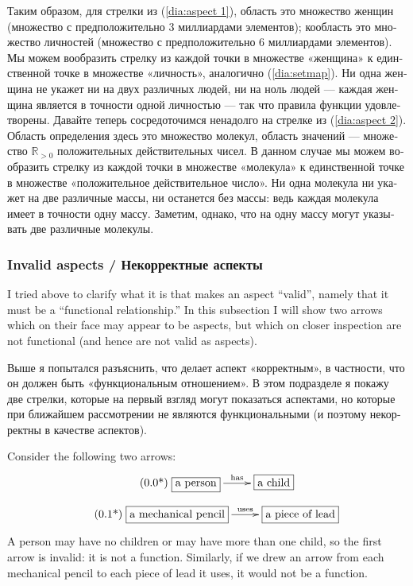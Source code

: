 \documentclass[a4paper]{book}
\def\tn{\textnormal}
\def\RR{{\mathbb R}}
\newcommand{\LA}[2]{\ar[#1]^-{\tn {#2}}}
\theoremstyle{myth}
\begin{document}
\begin{russian}
Таким образом, для стрелки из (\ref{dia:aspect 1}), область это множество женщин (множество с предположительно 3 миллиардами элементов); кообласть это множество личностей (множество с предположительно 6 миллиардами элементов).  Мы можем вообразить стрелку из каждой точки в множестве «женщина» к единственной точке в множестве «личность», аналогично (\ref{dia:setmap}).  Ни одна женщина не укажет ни на двух различных людей, ни на ноль людей — каждая женщина является в точности одной личностью — так что правила функции удовлетворены.  Давайте теперь сосредоточимся ненадолго на стрелке из (\ref{dia:aspect 2}).  Область определения здесь это множество молекул, область значений — множество $\RR_{>0}$ положительных действительных чисел.  В данном случае мы можем вообразить стрелку из каждой точки в множестве «молекула» к единственной точке в множестве «положительное действительное число».  Ни одна молекула ни укажет на две различные массы, ни останется без массы: ведь каждая молекула имеет в точности одну массу.  Заметим, однако, что на одну массу могут указывать две различные молекулы.


\subsubsection{Invalid aspects / Некорректные аспекты}\label{sec:invalid aspect}

I tried above to clarify what it is that makes an aspect “valid”, namely that it must be a “functional relationship.”  In this subsection I will show two arrows which on their face may appear to be aspects, but which on closer inspection are not functional (and hence are not valid as aspects).  
 
Выше я попытался разъяснить, что делает аспект «корректным», в частности, что он должен быть «функциональным отношением».  В этом подразделе я покажу две стрелки, которые на первый взгляд могут показаться аспектами, но которые при ближайшем рассмотрении не являются функциональными (и поэтому некорректны в качестве аспектов).   

Consider the following two arrows:
\begin{align}\tag{\arabic{subsection}.\arabic{equation}*}\addtocounter{equation}{1}\label{dia:invalid 1}
\xymatrixnocompile{\fbox{a person}\LA{r}{has}&\fbox{a child}}
\end{align}
\vspace{-.13in}
\begin{align}\tag{\arabic{subsection}.\arabic{equation}*}\addtocounter{equation}{1}\label{dia:invalid 2}
\xymatrixnocompile{\fbox{a mechanical pencil}\LA{r}{uses}&\fbox{a piece of lead}}
\end{align}  
A person may have no children or may have more than one child, so the first arrow is invalid: it is not a function.  Similarly, if we drew an arrow from each mechanical pencil to each piece of lead it uses, it would not be a function.


\end{russian}
\end{document}
